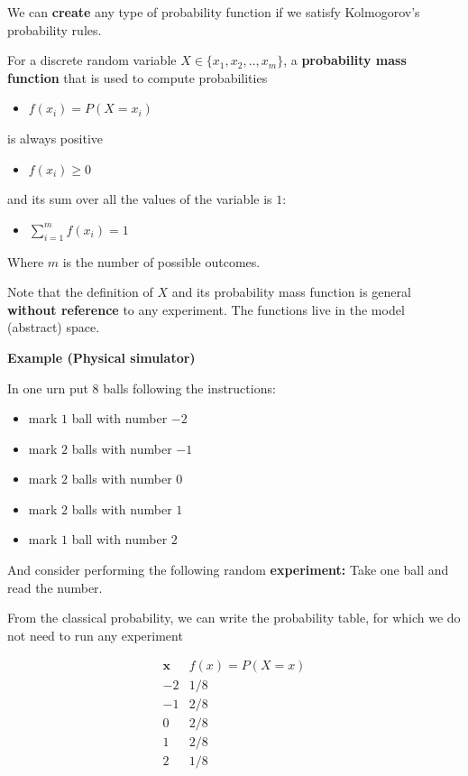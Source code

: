 \documentclass[
]{book}
\providecommand{\tightlist}{%
  \setlength{\itemsep}{0pt}\setlength{\parskip}{0pt}}
\begin{document}
We can \textbf{create} any type of probability function if we satisfy Kolmogorov's probability rules.

For a discrete random variable \(X \in \{x_1 , x_2 , .. , x_m\}\), a \textbf{probability mass function} that is used to compute probabilities

\begin{itemize}
\tightlist
\item
  \(f(x_i)=P(X=x_i)\)
\end{itemize}

is always positive

\begin{itemize}
\tightlist
\item
  \(f(x_i)\geq 0\)
\end{itemize}

and its sum over all the values of the variable is \(1\):

\begin{itemize}
\tightlist
\item
  \(\sum_{i=1}^m f(x_i)=1\)
\end{itemize}

Where \(m\) is the number of possible outcomes.

Note that the definition of \(X\) and its probability mass function is general \textbf{without reference} to any experiment. The functions live in the model (abstract) space.

\textbf{Example (Physical simulator)}

In one urn put \(8\) balls following the instructions:

\begin{itemize}
\tightlist
\item
  mark \(1\) ball with number \(-2\)
\item
  mark \(2\) balls with number \(-1\)
\item
  mark \(2\) balls with number \(0\)
\item
  mark \(2\) balls with number \(1\)
\item
  mark \(1\) ball with number \(2\)
\end{itemize}

And consider performing the following random \textbf{experiment:} Take one ball and read the number.

From the classical probability, we can write the probability table, for which we do not need to run any experiment

\[
\begin{array}{cc}
\mathbf{x} & f(x)=P(X=x) \\
-2 & 1/8 \\
-1 & 2/8\\
0 & 2/8 \\
1 & 2/8 \\
2 & 1/8 \\
\end{array}
\]
\end{document}
